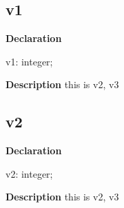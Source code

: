 \documentclass{report}
\newif\ifpdf
\begin{document}
\subsection*{v1}
\fi
\label{test-v1}
\begin{list}{}{
\setlength{\itemindent}{0cm}
\setlength{\listparindent}{0cm}
\setlength{\leftmargin}{\evensidemargin}
\addtolength{\leftmargin}{\tmplength}
\settowidth{\labelsep}{X}
\addtolength{\leftmargin}{\labelsep}
\setlength{\labelwidth}{\tmplength}
}
\item[\textbf{Declaration}\hfill]
\ifpdf
\begin{flushleft}
\fi
\begin{ttfamily}
v1: integer;\end{ttfamily}

\ifpdf
\end{flushleft}
\fi

\par
\item[\textbf{Description}]
this is v2, v3

\end{list}
\ifpdf
\subsection*{\large{\textbf{v2}}\normalsize\hspace{1ex}\hrulefill}
\else
\subsection*{v2}
\fi
\label{test-v2}
\begin{list}{}{
\setlength{\itemindent}{0cm}
\setlength{\listparindent}{0cm}
\setlength{\leftmargin}{\evensidemargin}
\addtolength{\leftmargin}{\tmplength}
\settowidth{\labelsep}{X}
\addtolength{\leftmargin}{\labelsep}
\setlength{\labelwidth}{\tmplength}
}
\item[\textbf{Declaration}\hfill]
\ifpdf
\begin{flushleft}
\fi
\begin{ttfamily}
v2: integer;\end{ttfamily}

\ifpdf
\end{flushleft}
\fi

\par
\item[\textbf{Description}]
this is v2, v3

\end{list}
\ifpdf
\end{document}
